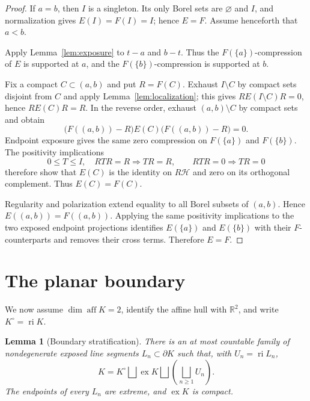 \documentclass[11pt,a4paper]{amsart}
\newtheorem{lemma}[theorem]{Lemma}
\theoremstyle{remark}
\newcommand{\aff}{\operatorname{aff}}
\newcommand{\ri}{\operatorname{ri}}
\newcommand{\ex}{\operatorname{ex}}
\newcommand{\calH}{\mathcal H}
\begin{document}
\begin{proof}
If \(a=b\), then \(I\) is a singleton.  Its only Borel sets are
\(\varnothing\) and \(I\), and normalization gives \(E(I)=F(I)=I\);
hence \(E=F\).  Assume henceforth that \(a<b\).

Apply Lemma~\ref{lem:exposure} to \(t-a\) and \(b-t\).  Thus the
\(F(\{a\})\)-compression of \(E\) is supported at \(a\), and the
\(F(\{b\})\)-compression is supported at \(b\).

Fix a compact \(C\subset(a,b)\) and put \(R=F(C)\).  Exhaust
\(I\setminus C\) by compact sets disjoint from \(C\) and apply
Lemma~\ref{lem:localization}; this gives
\(RE(I\setminus C)R=0\), hence \(RE(C)R=R\).  In the reverse order, exhaust
\((a,b)\setminus C\) by compact sets and obtain
\[
 \bigl(F((a,b))-R\bigr)E(C)\bigl(F((a,b))-R\bigr)=0.
\]
Endpoint exposure gives the same zero compression on \(F(\{a\})\) and
\(F(\{b\})\).  The positivity implications
\[
 0\leq T\leq I,\quad RTR=R\Rightarrow TR=R,
 \qquad RTR=0\Rightarrow TR=0
\]
therefore show that \(E(C)\) is the identity on \(R\calH\) and zero on its
orthogonal complement.  Thus \(E(C)=F(C)\).

Regularity and polarization extend equality to all Borel subsets of
\((a,b)\).  Hence \(E((a,b))=F((a,b))\).  Applying the same positivity
implications to the two exposed endpoint projections identifies
\(E(\{a\})\) and \(E(\{b\})\) with their \(F\)-counterparts and removes their
cross terms.  Therefore \(E=F\).
\end{proof}

\section{The planar boundary}

We now assume \(\dim\aff K=2\), identify the affine hull with
\(\mathbb R^2\), and write \(K^\circ=\ri K\).

\begin{lemma}[Boundary stratification]\label{lem:stratification}
There is an at most countable family of nondegenerate exposed line segments
\(L_n\subset\partial K\) such that, with \(U_n=\ri L_n\),
\begin{equation}\label{eq:stratification}
 K=K^\circ\bigsqcup\ex K\bigsqcup
   \left(\bigsqcup_{n\geq1}U_n\right).
\end{equation}
The endpoints of every \(L_n\) are extreme, and \(\ex K\) is compact.
\end{lemma}
\end{document}
